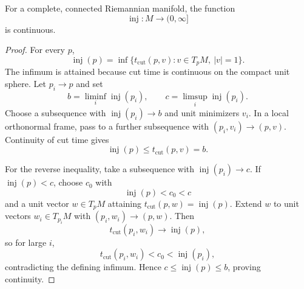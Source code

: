 \begin{proposition}
\label{prop:continuity-injectivity-radius}

For a complete, connected Riemannian manifold, the function
\[
\operatorname{inj}\colon M\longrightarrow(0,\infty]
\]
is continuous.

\begin{proof}
\sketch For every $p$,
\[
\operatorname{inj}(p)
=\inf\{t_{\mathrm{cut}}(p,v):v\in T_pM,\ |v|=1\}.
\]
The infimum is attained because cut time is continuous on the compact unit
sphere. Let $p_i\to p$ and set
\[
b=\liminf_i\operatorname{inj}(p_i),
\qquad
c=\limsup_i\operatorname{inj}(p_i).
\]
Choose a subsequence with $\operatorname{inj}(p_i)\to b$ and unit minimizers
$v_i$. In a local orthonormal frame, pass to a further subsequence with
$(p_i,v_i)\to(p,v)$. Continuity of cut time gives
\[
\operatorname{inj}(p)
\leq t_{\mathrm{cut}}(p,v)
=b.
\]

For the reverse inequality, take a subsequence with
$\operatorname{inj}(p_i)\to c$. If $\operatorname{inj}(p)<c$, choose
$c_0$ with
\[
\operatorname{inj}(p)<c_0<c
\]
and a unit vector $w\in T_pM$ attaining
$t_{\mathrm{cut}}(p,w)=\operatorname{inj}(p)$. Extend $w$ to unit vectors
$w_i\in T_{p_i}M$ with $(p_i,w_i)\to(p,w)$. Then
\[
t_{\mathrm{cut}}(p_i,w_i)\longrightarrow\operatorname{inj}(p),
\]
so for large $i$,
\[
t_{\mathrm{cut}}(p_i,w_i)<c_0<\operatorname{inj}(p_i),
\]
contradicting the defining infimum. Hence
$c\leq\operatorname{inj}(p)\leq b$, proving continuity.
\end{proof}
\end{proposition}

